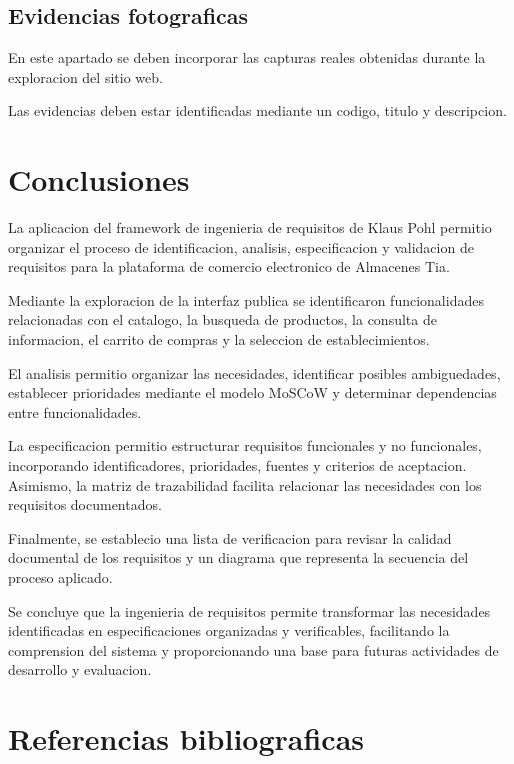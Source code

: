 \documentclass[11pt,a4paper]{article}
\begin{document}
\subsection{Evidencias fotograficas}

En este apartado se deben incorporar las capturas
reales obtenidas durante la exploracion del sitio web.

Las evidencias deben estar identificadas mediante
un codigo, titulo y descripcion.

\section{Conclusiones}

La aplicacion del framework de ingenieria de
requisitos de Klaus Pohl permitio organizar
el proceso de identificacion, analisis,
especificacion y validacion de requisitos
para la plataforma de comercio electronico
de Almacenes Tia.

Mediante la exploracion de la interfaz publica
se identificaron funcionalidades relacionadas
con el catalogo, la busqueda de productos,
la consulta de informacion, el carrito de compras
y la seleccion de establecimientos.

El analisis permitio organizar las necesidades,
identificar posibles ambiguedades, establecer
prioridades mediante el modelo MoSCoW y
determinar dependencias entre funcionalidades.

La especificacion permitio estructurar requisitos
funcionales y no funcionales, incorporando
identificadores, prioridades, fuentes y criterios
de aceptacion. Asimismo, la matriz de trazabilidad
facilita relacionar las necesidades con los
requisitos documentados.

Finalmente, se establecio una lista de verificacion
para revisar la calidad documental de los requisitos
y un diagrama que representa la secuencia del
proceso aplicado.

Se concluye que la ingenieria de requisitos
permite transformar las necesidades identificadas
en especificaciones organizadas y verificables,
facilitando la comprension del sistema y
proporcionando una base para futuras actividades
de desarrollo y evaluacion.

\section{Referencias bibliograficas}
\end{document}
